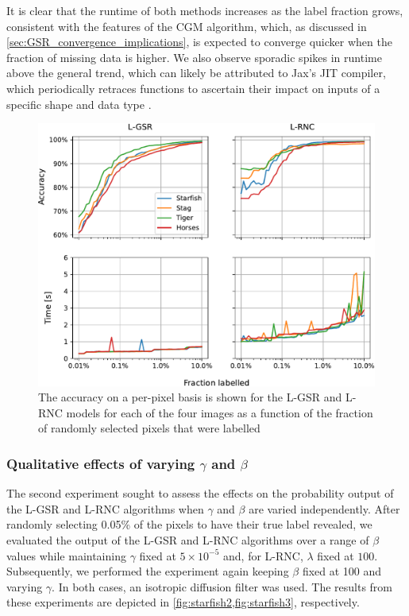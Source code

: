 It is clear that the runtime of both methods increases as the label fraction grows, consistent with the features of the CGM algorithm, which, as discussed in \cref{sec:GSR_convergence_implications}, is expected to converge quicker when the fraction of missing data is higher. We also observe sporadic spikes in runtime above the general trend, which can likely be attributed to Jax's JIT compiler, which periodically retraces functions to ascertain their impact on inputs of a specific shape and data type \citep{Bradbury2018}.


\begin{figure}[t] 
    \begin{center}
        \includegraphics[width=0.9\linewidth]{Figures/fraction_labelled.pdf}
    \end{center}
   \caption[Accuracy of binary L-GSR and L-RNC models as a function of label fraction]{The accuracy on a per-pixel basis is shown for the L-GSR and L-RNC models for each of the four images as a function of the fraction of randomly selected pixels that were labelled} 
    \label{fig:fraction_labelled}
\end{figure}

\subsubsection{Qualitative effects of varying \texorpdfstring{$\gamma$}{gamma} and \texorpdfstring{$\beta$}{beta}}

The second experiment sought to assess the effects on the probability output of the L-GSR and L-RNC algorithms when $\gamma$ and $\beta$ are varied independently. After randomly selecting 0.05\% of the pixels to have their true label revealed, we evaluated the output of the L-GSR and L-RNC algorithms over a range of $\beta$ values while maintaining $\gamma$ fixed at $5 \times 10^{-5}$ and, for L-RNC, $\lambda$ fixed at $100$. Subsequently, we performed the experiment again keeping $\beta$ fixed at 100 and varying $\gamma$. In both cases, an isotropic diffusion filter was used. The results from these experiments are depicted in \cref{fig:starfish2,fig:starfish3}, respectively.

